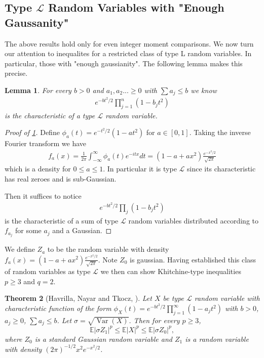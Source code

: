 \documentclass[10pt]{article}
\newcommand{\E}{\mathbb{E}}
\newcommand{\1}{\textbf{1}}
\DeclareMathOperator{\Var}{Var}
\newtheorem{theorem}{Theorem}[subsection]
\newtheorem{lemma}[theorem]{Lemma}
\theoremstyle{remark}
\theoremstyle{definition}
\begin{document}
\subsection{Type $\mathcal{L}$ Random Variables with "Enough Gaussanity"}

The above results hold only for even integer moment comparisons. We now turn our attention to inequalites for a restricted class of type L random variables. In particular, those with "enough gaussianity". The following lemma makes this precise.

\begin{lemma}\label{lem:L1}
	For every $b > 0$ and $a_1,a_2...\geq 0$ with $\sum a_j \leq b$ we know
	\begin{align*}
		e^{-bt^2/2}\prod_{j=1}^n (1-b_jt^2)
	\end{align*} 
	is the characteristic of a type $\mathcal{L}$ random variable. 
\end{lemma}

\begin{proof}[Proof of \ref{lem:L1}]
	Define $\phi_a(t) = e^{-t^2/2}(1-at^2)$ for $a \in [0,1]$. Taking the inverse Fourier transform we have
	\begin{align*}
		f_a(x) = \frac{1}{2\pi}\int_{-\infty}^{\infty}\phi_a(t)e^{-itx}dt = (1-a+ax^2)\frac{e^{-x^2/2}}{\sqrt{2\pi}}
	\end{align*}
	which is a density for $0 \leq a \leq 1$. In particular it is type $\mathcal{L}$ since its characteristic has real zeroes and is sub-Gaussian.

	Then it suffices to notice 
	\begin{align*}
		e^{-bt^2/2}\prod_j (1-b_jt^2)
	\end{align*} 
	is the characteristic of a sum of type $\mathcal{L}$ random variables distributed according to $f_{a_j}$ for some $a_j$ and a Gaussian. 
\end{proof}

We define $Z_a$ to be the random variable with density $f_a(x) = (1-a+ax^2)\frac{e^{-x^2/2}}{\sqrt{2\pi}}$. Note $Z_0$ is gaussian. Having established this class of random variables as type $\mathcal{L}$ we then can show Khitchine-type inequalities $p \geq 3$ and $q=2$. 

\begin{theorem}[Havrilla, Nayar and Tkocz, \cite{HNT}]\label{thm:L3}
Let $X$ be type $\mathcal{L}$ random variable with characteristic function of the form $\phi_X(t) = e^{-b t^2/2}\prod_{j=1}^\infty(1-a_jt^2)$ with $b > 0$, $a_j \geq 0$, $\sum a_j \leq b$. Let $\sigma = \sqrt{\Var(X)}$. Then for every $p \geq 3$, 
\[
\E|\sigma Z_1|^p \leq \E|X|^p \leq \E|\sigma Z_0|^p,\]
where $Z_0$ is a standard Gaussian random variable and $Z_1$ is a random variable with density $(2\pi)^{-1/2}x^2e^{-x^2/2}$.
\end{theorem}
\end{document}
